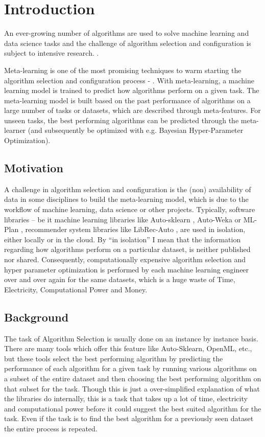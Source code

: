 \chapter{Introduction}
An ever-growing number of algorithms are used to solve machine learning and data science tasks and the challenge of algorithm selection and configuration is subject to intensive research.  \citep{bischl-et-al,brazdil:p,calandra-et-al,collins-et-al2018,romero-et-al,vartak-et-al}. 


Meta-learning is one of the most promising techniques to warm starting the algorithm selection and configuration process - \citep{hutter-et-al}. With meta-learning, a machine learning model is trained to predict how algorithms perform on a given task. The meta-learning model is built based on the past performance of algorithms on a large number of tasks or datasets, which are described through meta-features. For unseen tasks, the best performing algorithms can be predicted through the meta-learner (and subsequently be optimized with e.g. Bayesian Hyper-Parameter Optimization).

\section{Motivation}
A challenge in algorithm selection and configuration is the (non) availability of data in some disciplines to build the meta-learning model, which is due to the workflow of machine learning, data science or other projects. Typically, software libraries – be it machine learning libraries like Auto-sklearn \citep{feurer:m}, Auto-Weka \citep{kotthoff:l} or ML-Plan \citep{mohr:f}, recommender system libraries like LibRec-Auto \citep{mansoury:m}, are used in isolation, either locally or in the cloud. By “in isolation” I mean that the information regarding how algorithms perform on a particular dataset, is neither published nor shared. Consequently, computationally expensive algorithm selection and hyper parameter optimization is performed by each machine learning engineer over and over again for the same datasets, which is a huge waste of Time, Electricity, Computational Power and Money.

\section{Background}
The task of Algorithm Selection is usually done on an instance by instance basis. There are many tools which offer this feature like Auto-Sklearn, OpenML, etc., but these tools select the best performing algorithm by predicting the performance of each algorithm for a given task by running various algorithms on a subset of the entire dataset and then choosing the best performing algorithm on that subset for the task. Though this is just a over-simplified explanation of what the libraries do internally, this is a task that takes up a lot of time, electricity and computational power before it could suggest the best suited algorithm for the task. Even if the task is to find the best algorithm for a previously seen dataset the entire process is repeated.

